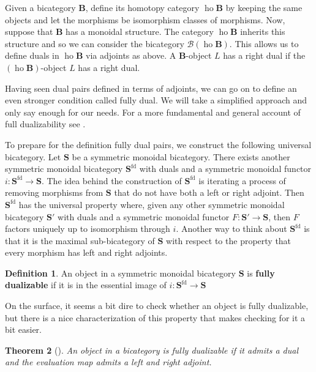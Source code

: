 \documentclass[11pt]{amsart}
\newcommand{\op}[1]{\operatorname{#1}}
\newcommand{\cat}[1]{\mathbf{#1}}
\newcommand{\from}{\colon}
\newtheorem{thm}{Theorem}[section]
\theoremstyle{remark}
\theoremstyle{definition}
\newtheorem{defn}[thm]{Definition}
\begin{document}
Given a bicategory $\cat{B}$, define its homotopy category $\op{ho} \cat{B}$ by keeping the same objects and let the morphisms be isomorphism classes of morphisms. Now, suppose that $\cat{B}$ has a monoidal structure. The category $\op{ho} \cat{B}$ inherits this structure and so we can consider the bicategory $\mathcal{B} (\op{ho} \cat{B})$. This allows us to define duals in $\op{ho}\cat{B}$ via adjoints as above. A $\cat{B}$-object $L$ has a right dual if the $(\op{ho} \cat{B})$-object $L$ has a right dual.

Having seen dual pairs defined in terms of adjoints, we can go on to define an even stronger condition called fully dual.  We will take a simplified approach and only say enough for our needs. For a more fundamental and general account of full dualizability see \cite{Lurie,Piotr}. 

To prepare for the definition fully dual pairs, we construct the following universal bicategory. Let $\cat{S}$ be a symmetric monoidal bicategory. There exists another symmetric monoidal bicategory $\cat{S}^{\text{fd}}$ with duals and a symmetric monoidal functor $i \from \cat{S}^{\text{fd}} \to \cat{S}$.  The idea behind the construction of $\cat{S}^{\text{fd}}$ is iterating a process of removing morphisms from $\cat{S}$ that do not have both a left or right adjoint. Then $\cat{S}^{\text{fd}}$ has the universal property where, given any other symmetric monoidal bicategory $\cat{S}'$ with duals and a symmetric monoidal functor $F \from \cat{S}' \to \cat{S}$, then $F$ factors uniquely up to isomorphism through $i$. Another way to think about $\cat{S}^{\text{fd}}$ is that it is the maximal sub-bicategory of $\cat{S}$ with respect to the property that every morphism has left and right adjoints.  

\begin{defn}
\label{def:FullDual}
	An object in a symmetric monoidal bicategory $\cat{S}$ is \textbf{fully dualizable} if it is in the essential image of $i \from \cat{S}^{\text{fd}} \to \cat{S}$
\end{defn}  

On the surface, it seems a bit dire to check whether an object is fully dualizable, but there is a nice characterization of this property that makes checking for it a bit easier.

\begin{thm}[{\cite[Prop.~4.2.3]{Lurie}}]
	An object in a bicategory is fully dualizable if it admits a dual and the evaluation map admits a left and right adjoint.  
\end{thm}
\end{document}
